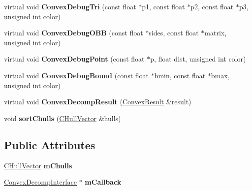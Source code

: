 \begin{DoxyCompactItemize}
\item 
\hypertarget{class_convex_builder_a0d4761811c1aba03501f99c7fd3ac60b}{virtual void {\bfseries Convex\+Debug\+Tri} (const float $\ast$p1, const float $\ast$p2, const float $\ast$p3, unsigned int color)}\label{class_convex_builder_a0d4761811c1aba03501f99c7fd3ac60b}

\item 
\hypertarget{class_convex_builder_afb3bd186b8c5474987a8802fa3862207}{virtual void {\bfseries Convex\+Debug\+O\+B\+B} (const float $\ast$sides, const float $\ast$matrix, unsigned int color)}\label{class_convex_builder_afb3bd186b8c5474987a8802fa3862207}

\item 
\hypertarget{class_convex_builder_a27c203170b0517f2cafa230e668bfb53}{virtual void {\bfseries Convex\+Debug\+Point} (const float $\ast$p, float dist, unsigned int color)}\label{class_convex_builder_a27c203170b0517f2cafa230e668bfb53}

\item 
\hypertarget{class_convex_builder_ae70b8ed34b425867f6bd8fb0a85d63fa}{virtual void {\bfseries Convex\+Debug\+Bound} (const float $\ast$bmin, const float $\ast$bmax, unsigned int color)}\label{class_convex_builder_ae70b8ed34b425867f6bd8fb0a85d63fa}

\item 
\hypertarget{class_convex_builder_aa5ebbc3fb58777ff67f38900d54c2471}{virtual void {\bfseries Convex\+Decomp\+Result} (\hyperlink{class_convex_decomposition_1_1_convex_result}{Convex\+Result} \&result)}\label{class_convex_builder_aa5ebbc3fb58777ff67f38900d54c2471}

\item 
\hypertarget{class_convex_builder_a0bc79e8799a0c7daf3647b906e56a8c6}{void {\bfseries sort\+Chulls} (\hyperlink{classbt_aligned_object_array}{C\+Hull\+Vector} \&hulls)}\label{class_convex_builder_a0bc79e8799a0c7daf3647b906e56a8c6}

\end{DoxyCompactItemize}
\subsection*{Public Attributes}
\begin{DoxyCompactItemize}
\item 
\hypertarget{class_convex_builder_a3afe639e250fe275559683d53d64cf8d}{\hyperlink{classbt_aligned_object_array}{C\+Hull\+Vector} {\bfseries m\+Chulls}}\label{class_convex_builder_a3afe639e250fe275559683d53d64cf8d}

\item 
\hypertarget{class_convex_builder_a1f6f37473a9fe6abd1ea82d07d077a94}{\hyperlink{class_convex_decomposition_1_1_convex_decomp_interface}{Convex\+Decomp\+Interface} $\ast$ {\bfseries m\+Callback}}\label{class_convex_builder_a1f6f37473a9fe6abd1ea82d07d077a94}

\end{DoxyCompactItemize}


